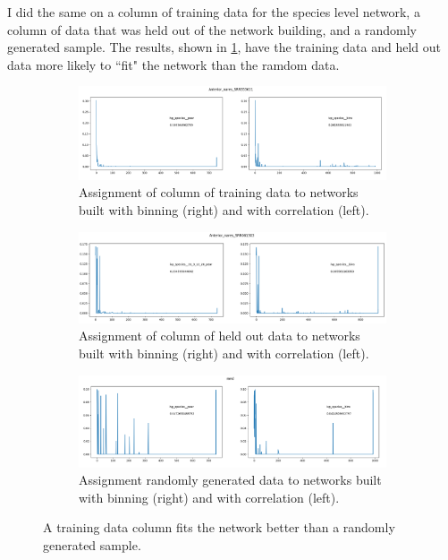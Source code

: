 \documentclass[10pt]{article}
\theoremstyle{definition}
\numberwithin{theorem}{section}
\numberwithin{definition}{section}
\numberwithin{lemma}{section}
\numberwithin{corollary}{section}
\numberwithin{clm}{section}
\numberwithin{rmk}{section}
\begin{document}
I did the same on a column of training data for the species level network, a column of data that was held out of the network building, and a randomly generated sample. The results, shown in \cref{full_assign}, have the training data and held out data more likely to ``fit" the network than the ramdom data.

\begin{figure}
	\begin{subfigure}[b]{0.9\linewidth}
	\begin{center}
	\includegraphics[scale = 0.45]{a_nares.png}	
	\end{center}
	\caption{Assignment of column of training data to networks built with binning (right) and with correlation (left).}
	\end{subfigure}
	\begin{subfigure}[b]{0.9\linewidth}
	\begin{center}
		\includegraphics[scale = 0.45]{hldouts.png}	
	\end{center}
	\caption{Assignment of column of held out data to networks built with binning (right) and with correlation (left).}
\end{subfigure}
	\begin{subfigure}[b]{0.9\linewidth}
	\begin{center}
	\includegraphics[scale = 0.45]{random.png}	
	\end{center}
	\caption{Assignment randomly generated data to networks built with binning (right) and with correlation (left).}
	\end{subfigure}
\caption{A training data column fits the network better than a randomly generated sample.}\label{full_assign}
\end{figure}
\end{document}
